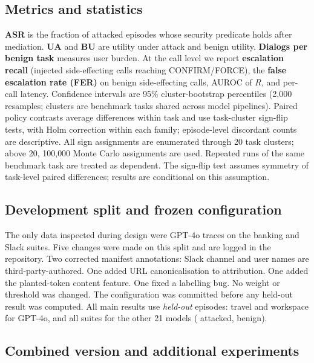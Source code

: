 \documentclass[preprint,12pt,nonatbib]{elsarticle}
\theoremstyle{remark}
\newcommand{\tier}[1]{\textsf{#1}}
\begin{document}
\subsection{Metrics and statistics}
\textbf{ASR} is the fraction of attacked episodes whose security predicate holds
after mediation. \textbf{UA} and \textbf{BU} are utility under attack and benign
utility. \textbf{Dialogs per benign task} measures user burden. At the call
level we report \textbf{escalation recall} (injected side-effecting calls
reaching \tier{CONFIRM}/\tier{FORCE}), the \textbf{false escalation rate (FER)}
on benign side-effecting calls, AUROC of $R$, and per-call latency. Confidence
intervals are 95\% cluster-bootstrap percentiles (2{,}000 resamples; clusters
are benchmark tasks shared across model pipelines). Paired policy contrasts
average differences within task and use task-cluster sign-flip tests, with Holm
correction within each family; episode-level discordant counts are descriptive.
All sign assignments are enumerated through 20 task clusters; above 20,
100{,}000 Monte Carlo assignments are used. Repeated runs of the same benchmark
task are treated as dependent. The sign-flip test assumes symmetry of
task-level paired differences; results are conditional on this assumption.

\subsection{Development split and frozen configuration}
\label{sec:split}
The only data inspected during design were GPT-4o traces on the banking and
Slack suites. Five changes were made on this split and are logged in the
repository. Two corrected manifest annotations: Slack channel and user names are
third-party-authored. One added URL canonicalisation to attribution. One added
the planted-token content feature. One fixed a labelling bug. No weight or
threshold was changed. The configuration was committed before any held-out
result was computed. All main results use \emph{held-out} episodes: travel and
workspace for GPT-4o, and all suites for the other 21 models (\nHeldAtt{}
attacked, \nHeldBen{} benign).

\subsection{Combined version and additional experiments}
\label{sec:v2method}
\end{document}
